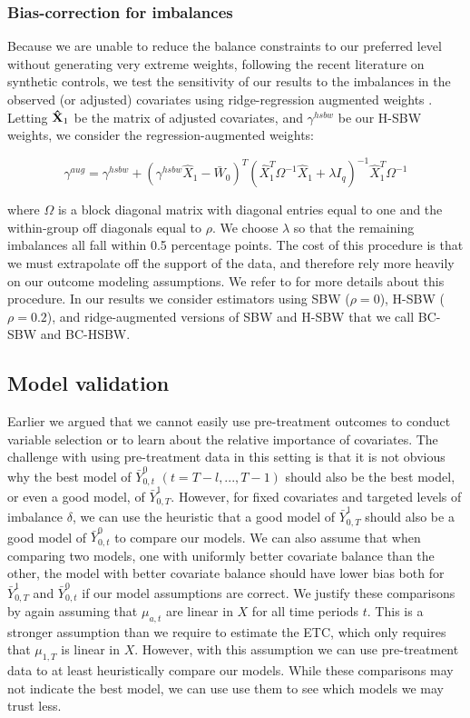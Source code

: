 \subsubsection{Bias-correction for imbalances}

Because we are unable to reduce the balance constraints to our preferred level without generating very extreme weights, following the recent literature on synthetic controls, we test the sensitivity of our results to the imbalances in the observed (or adjusted) covariates using ridge-regression augmented weights \cite{ben2018augmented}. Letting $\mathbf{\hat{X}}_1$ be the matrix of adjusted covariates, and $\gamma^{hsbw}$ be our H-SBW weights, we consider the regression-augmented weights:

\begin{equation}
\gamma^{aug} = \gamma^{hsbw} + (\gamma^{hsbw}\hat{X}_1 - \bar{W}_0)^T(\hat{X}_1^T\Omega^{-1}\hat{X}_1 + \lambda I_q)^{-1}\hat{X}_1^T\Omega^{-1}
\end{equation}

where $\Omega$ is a block diagonal matrix with diagonal entries equal to one and the within-group off diagonals equal to $\rho$. We choose $\lambda$ so that the remaining imbalances all fall within 0.5 percentage points. The cost of this procedure is that we must extrapolate off the support of the data, and therefore rely more heavily on our outcome modeling assumptions. We refer to \cite{ben2018augmented} for more details about this procedure. In our results we consider estimators using SBW ($\rho = 0$), H-SBW ($\rho = 0.2$), and ridge-augmented versions of SBW and H-SBW that we call BC-SBW and BC-HSBW. 

\subsection{Model validation}

Earlier we argued that we cannot easily use pre-treatment outcomes to conduct variable selection or to learn about the relative importance of covariates. The challenge with using pre-treatment data in this setting is that it is not obvious why the best model of $\bar{Y}_{0, t}^0$ $(t = T-l,..., T-1)$ should also be the best model, or even a good model, of $\bar{Y}^1_{0,T}$. However, for fixed covariates and targeted levels of imbalance $\delta$, we can use the heuristic that a good model of $\bar{Y}^1_{0,T}$ should also be a good model of $\bar{Y}_{0, t}^0$ to compare our models. We can also assume that when comparing two models, one with uniformly better covariate balance than the other, the model with better covariate balance should have lower bias both for $\bar{Y}_{0, T}^1$ and $\bar{Y}_{0, t}^0$ if our model assumptions are correct. We justify these comparisons by again assuming that $\mu_{a, t}$ are linear in $X$ for all time periods $t$. This is a stronger assumption than we require to estimate the ETC, which only requires that $\mu_{1, T}$ is linear in $X$. However, with this assumption we can use pre-treatment data to at least heuristically compare our models. While these comparisons may not indicate the best model, we can use use them to see which models we may trust less.

